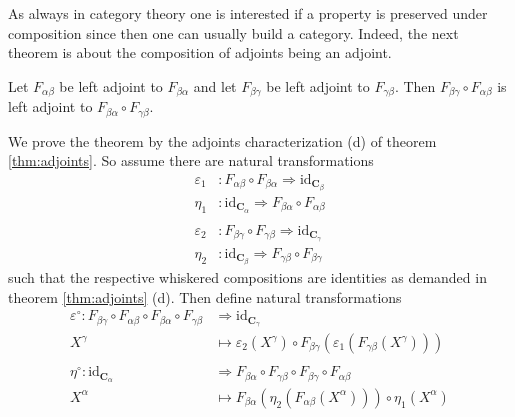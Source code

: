 As always in category theory one is interested if a property is preserved under composition since then one can usually build a category. Indeed, the next theorem is about the composition of adjoints being an adjoint.
\\
\begin{thm}
\label{thm:adjointcomp}
Let $F_{\alpha\beta}$ be left adjoint to $F_{\beta\alpha}$ and let $F_{\beta\gamma}$ be left adjoint to $F_{\gamma\beta}$. Then $F_{\beta\gamma} \circ F_{\alpha\beta}$ is left adjoint to $F_{\beta\alpha} \circ F_{\gamma\beta}$.
\end{thm}
\begin{prf}
We prove the theorem by the adjoints characterization (d) of theorem \ref{thm:adjoints}. So assume there are natural transformations
\begin{align*}
  \varepsilon_{1}
  &\colon
  F_{\alpha\beta}
  \circ
  F_{\beta\alpha}
  \Rightarrow
  \mathrm{id}_{\mathbf{C}_{\beta}}
  \\
  \eta_{1}
  &\colon
  \mathrm{id}_{\mathbf{C}_{\alpha}}
  \Rightarrow
  F_{\beta\alpha}
  \circ
  F_{\alpha\beta}
  \\\\
  \varepsilon_{2}
  &\colon
  F_{\beta\gamma}
  \circ
  F_{\gamma\beta}
  \Rightarrow
  \mathrm{id}_{\mathbf{C}_{\gamma}}
  \\
  \eta_{2}
  &\colon
  \mathrm{id}_{\mathbf{C}_{\beta}}
  \Rightarrow
  F_{\gamma\beta}
  \circ
  F_{\beta\gamma}
\end{align*}
such that the respective whiskered compositions are identities as demanded in theorem \ref{thm:adjoints} (d). Then define natural transformations
\begin{align*}
  \varepsilon^{\circ}
  \colon
  F_{\beta\gamma}
  \circ
  F_{\alpha\beta}
  \circ
  F_{\beta\alpha}
  \circ
  F_{\gamma\beta}
  &\Rightarrow
  \mathrm{id}_{\mathbf{C}_{\gamma}}
  \\
  X^{\gamma}
  &\mapsto
  \varepsilon_{2}(X^{\gamma})
  \circ
  F_{\beta\gamma}
  \left(
    \varepsilon_{1}
    \left(
      F_{\gamma\beta}(X^{\gamma})
    \right)
  \right)
  \\\\
  \eta^{\circ}
  \colon
  \mathrm{id}_{\mathbf{C}_{\alpha}}
  &\Rightarrow
  F_{\beta\alpha}
  \circ
  F_{\gamma\beta}
  \circ
  F_{\beta\gamma}
  \circ
  F_{\alpha\beta}
  \\
  X^{\alpha}
  &\mapsto
  F_{\beta\alpha}
  \left(
    \eta_{2}
    \left(
      F_{\alpha\beta}(X^{\alpha})
    \right)
  \right)
  \circ
  \eta_{1}(X^{\alpha})

\end{align*}
\end{prf}
